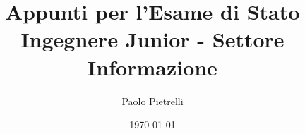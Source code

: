 \documentclass[a4paper,12pt,openright,twoside]{book} %
\title{Appunti per l'Esame di Stato\\Ingegnere Junior - Settore Informazione}
\author{Paolo Pietrelli}
\date{\today} %
\begin{document}
\sloppy %

\frontmatter %

\maketitle %


\tableofcontents %
\listoffigures %
\lstlistoflistings %

\mainmatter %








\end{document}
